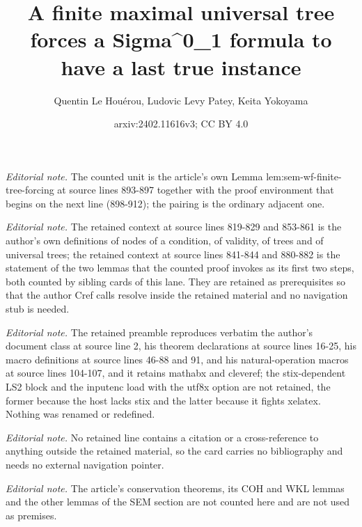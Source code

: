 \documentclass{article}
\title{A finite maximal universal tree forces a Sigma\textasciicircum{}0\_1 formula to have a last true instance}
\author{Quentin Le Houérou, Ludovic Levy Patey, Keita Yokoyama}
\date{arxiv:2402.11616v3; CC BY 4.0}
\numberwithin{theorem}{section}
\begin{document}
\maketitle
\noindent\textit{Editorial note.} The counted unit is the article's own Lemma lem:sem-wf-finite-tree-forcing at source lines 893-897 together with the proof environment that begins on the next line (898-912); the pairing is the ordinary adjacent one.\par\medskip
\noindent\textit{Editorial note.} The retained context at source lines 819-829 and 853-861 is the author's own definitions of nodes of a condition, of validity, of trees and of universal trees; the retained context at source lines 841-844 and 880-882 is the statement of the two lemmas that the counted proof invokes as its first two steps, both counted by sibling cards of this lane. They are retained as prerequisites so that the author Cref calls resolve inside the retained material and no navigation stub is needed.\par\medskip
\noindent\textit{Editorial note.} The retained preamble reproduces verbatim the author's document class at source line 2, his theorem declarations at source lines 16-25, his macro definitions at source lines 46-88 and 91, and his natural-operation macros at source lines 104-107, and it retains mathabx and cleveref; the stix-dependent LS2 block and the inputenc load with the utf8x option are not retained, the former because the host lacks stix and the latter because it fights xelatex. Nothing was renamed or redefined.\par\medskip
\noindent\textit{Editorial note.} No retained line contains a citation or a cross-reference to anything outside the retained material, so the card carries no bibliography and needs no external navigation pointer.\par\medskip
\noindent\textit{Editorial note.} The article's conservation theorems, its COH and WKL lemmas and the other lemmas of the SEM section are not counted here and are not used as premises.\par\medskip
\end{document}
